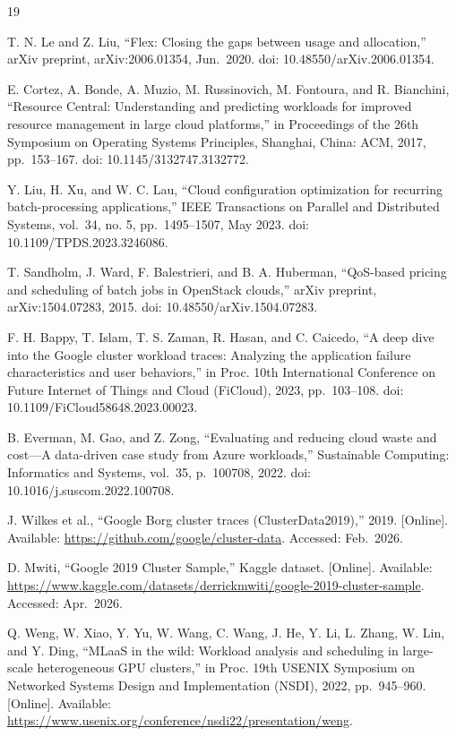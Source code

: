 \documentclass{IEEEtran}
\begin{document}
\begin{thebibliography}{19}

T. N. Le and Z. Liu, ``Flex: Closing the gaps between usage and allocation,'' arXiv preprint, arXiv:2006.01354, Jun.~2020. doi: 10.48550/arXiv.2006.01354.

E. Cortez, A. Bonde, A. Muzio, M. Russinovich, M. Fontoura, and R. Bianchini, ``Resource Central: Understanding and predicting workloads for improved resource management in large cloud platforms,'' in Proceedings of the 26th Symposium on Operating Systems Principles, Shanghai, China: ACM, 2017, pp.~153--167. doi: 10.1145/3132747.3132772.

Y. Liu, H. Xu, and W. C. Lau, ``Cloud configuration optimization for recurring batch-processing applications,'' IEEE Transactions on Parallel and Distributed Systems, vol.~34, no. 5, pp.~1495--1507, May 2023. doi: 10.1109/TPDS.2023.3246086.

T. Sandholm, J. Ward, F. Balestrieri, and B. A. Huberman, ``QoS-based pricing and scheduling of batch jobs in OpenStack clouds,'' arXiv preprint, arXiv:1504.07283, 2015. doi: 10.48550/arXiv.1504.07283.

F. H. Bappy, T. Islam, T. S. Zaman, R. Hasan, and C. Caicedo, ``A deep dive into the Google cluster workload traces: Analyzing the application failure characteristics and user behaviors,'' in Proc. 10th International Conference on Future Internet of Things and Cloud (FiCloud), 2023, pp.~103--108. doi: 10.1109/FiCloud58648.2023.00023.

B. Everman, M. Gao, and Z. Zong, ``Evaluating and reducing cloud waste and cost---A data-driven case study from Azure workloads,'' Sustainable Computing: Informatics and Systems, vol.~35, p.~100708, 2022. doi: 10.1016/j.suscom.2022.100708.

J. Wilkes et al., ``Google Borg cluster traces (ClusterData2019),'' 2019. {[}Online{]}. Available: \url{https://github.com/google/cluster-data}. Accessed: Feb.~2026.

D. Mwiti, ``Google 2019 Cluster Sample,'' Kaggle dataset. {[}Online{]}. Available: \url{https://www.kaggle.com/datasets/derrickmwiti/google-2019-cluster-sample}. Accessed: Apr.~2026.

Q. Weng, W. Xiao, Y. Yu, W. Wang, C. Wang, J. He, Y. Li, L. Zhang, W. Lin, and Y. Ding, ``MLaaS in the wild: Workload analysis and scheduling in large-scale heterogeneous GPU clusters,'' in Proc. 19th USENIX Symposium on Networked Systems Design and Implementation (NSDI), 2022, pp.~945--960. {[}Online{]}. Available: \url{https://www.usenix.org/conference/nsdi22/presentation/weng}.


\end{thebibliography}
\end{document}
